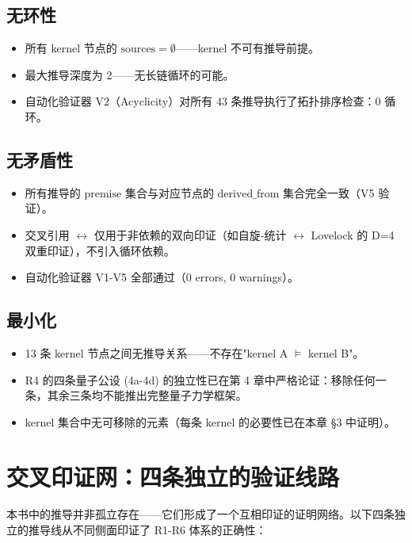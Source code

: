 \subsection{无环性}

\begin{itemize}
  \item 所有 kernel 节点的 $\text{sources} = \emptyset$——kernel 不可有推导前提。
  \item 最大推导深度为 2——无长链循环的可能。
  \item 自动化验证器 V2（Acyclicity）对所有 43 条推导执行了拓扑排序检查：0 循环。
\end{itemize}

\subsection{无矛盾性}

\begin{itemize}
  \item 所有推导的 $\text{premise}$ 集合与对应节点的 $\text{derived\_from}$ 集合完全一致（V5 验证）。
  \item 交叉引用 $\leftrightarrow$ 仅用于非依赖的双向印证（如自旋-统计 $\leftrightarrow$ Lovelock 的 D=4 双重印证），不引入循环依赖。
  \item 自动化验证器 V1-V5 全部通过（0 errors, 0 warnings）。
\end{itemize}

\subsection{最小化}

\begin{itemize}
  \item 13 条 kernel 节点之间无推导关系——不存在"kernel A $\models$ kernel B"。
  \item R4 的四条量子公设 (4a-4d) 的独立性已在第 4 章中严格论证：移除任何一条，其余三条均不能推出完整量子力学框架。
  \item kernel 集合中无可移除的元素（每条 kernel 的必要性已在本章 §3 中证明）。
\end{itemize}

\section{交叉印证网：四条独立的验证线路}

本书中的推导并非孤立存在——它们形成了一个互相印证的证明网络。以下四条独立的推导线从不同侧面印证了 R1-R6 体系的正确性：

